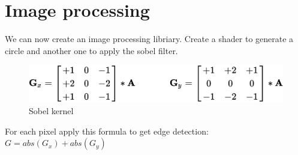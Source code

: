 \documentclass{article}
\begin{document}
\section{Image processing}
We can now create an image processing libriary. Create a shader to generate a circle and another one to apply the sobel filter.

\begin{figure}[H]
	\centering
	\includegraphics[scale=1]{figures/sobel_kernel.png}
	\caption{Sobel kernel}
\end{figure}

For each pixel apply this formula to get edge detection: $G = abs(G_x) + abs(G_y)$
\end{document}

